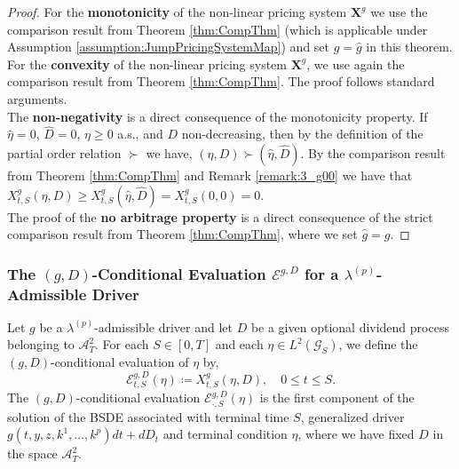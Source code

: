 \documentclass[11pt,a4paper]{article}
\numberwithin{equation}{section}
\theoremstyle{newPlain}
\theoremstyle{newDefinition}
\theoremstyle{newRemark}
\begin{document}
\begin{proof}For  the \textbf{monotonicity} of the non-linear pricing system $\mathbf{X}^g$ we use the comparison result from Theorem \ref{thm:CompThm} (which is applicable under  Assumption \ref{assumption:JumpPricingSystemMap}) and set $g=\hat{g}$ in this theorem.\\ %
		 For the \textbf{ convexity} of the non-linear pricing system $\mathbf{X}^g$,  we use again the comparison result from Theorem  \ref{thm:CompThm}. The proof follows standard arguments.\\
		The \textbf{non-negativity} is a direct  consequence of the monotonicity property. If $\hat{\eta} = 0$, $\hat{D}=0$, $\eta\ge0$ a.s., and $D$ non-decreasing, then by the definition of the partial order relation $\succ$ we have, $(\eta,D)\succ(\hat{\eta},\hat{D})$. By the comparison result from Theorem \ref{thm:CompThm} and Remark \ref{remark:3_g00} we have that $X_{t,S}^g(\eta,D)\ge X_{t,S}^g(\hat{\eta},\hat{D})=X_{t,S}^g(0,0)=0$.\\
 The proof of the \textbf{no arbitrage property} is a direct consequence of  the strict comparison result from Theorem \ref{thm:CompThm}, where we set $\hat{g}=g$.
\end{proof}

\subsubsection{\texorpdfstring{The $(g,D)$-Conditional Evaluation $\mathscr{E}^{g,D}$  for a $\lambda^{(p)}$-Admissible Driver}{The (g,D)-Conditional Evaluation EgD and EgD-Martingale for a lambda-p-Admissible Driver g}}\label{subsec:ThegdConditionalExpectation}

Let $g$ be a $\lambda^{(p)}$-admissible driver and let $D$ be a given  optional dividend process belonging to $\mathcal{A}_T^2$. For each $S\in[0,T]$ and each $\eta\in L^2(\mathcal{G}_S)$, we define the $(g,D)$-conditional evaluation of $\eta$ by,
\begin{equation*}
    \mathscr{E}_{t,S}^{g,D}(\eta)\coloneqq X_{t,S}^g(\eta,D),\quad0\le t\le S.
\end{equation*}
The $(g,D)$-conditional evaluation $\mathscr{E}_{\cdot,S}^{g,D}(\eta)$ is the first component of the solution of the BSDE associated with terminal time $S$, generalized driver $g(t,y,z,k^1,\ldots,k^p)dt + dD_t$ and terminal condition $\eta$, where we have fixed $D$ in the space $\mathcal{A}_T^2$.
\end{document}
